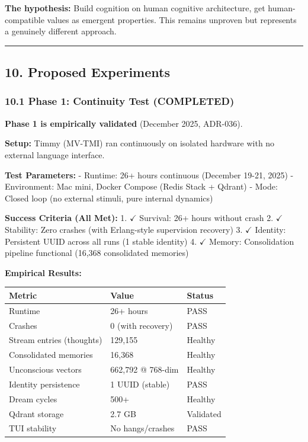 \documentclass[
]{article}
\begin{document}
\textbf{The hypothesis:} Build cognition on human cognitive
architecture, get human-compatible values as emergent properties. This
remains unproven but represents a genuinely different approach.

\begin{center}\rule{0.5\linewidth}{0.5pt}\end{center}

\hypertarget{proposed-experiments}{%
\subsection{10. Proposed Experiments}\label{proposed-experiments}}

\hypertarget{phase-1-continuity-test-completed}{%
\subsubsection{10.1 Phase 1: Continuity Test
(COMPLETED)}\label{phase-1-continuity-test-completed}}

\textbf{Phase 1 is empirically validated} (December 2025, ADR-036).

\textbf{Setup:} Timmy (MV-TMI) ran continuously on isolated hardware
with no external language interface.

\textbf{Test Parameters:} - Runtime: 26+ hours continuous (December
19-21, 2025) - Environment: Mac mini, Docker Compose (Redis Stack +
Qdrant) - Mode: Closed loop (no external stimuli, pure internal
dynamics)

\textbf{Success Criteria (All Met):} 1. $\checkmark$ Survival: 26+ hours without
crash 2. $\checkmark$ Stability: Zero crashes (with Erlang-style supervision
recovery) 3. $\checkmark$ Identity: Persistent UUID across all runs (1 stable
identity) 4. $\checkmark$ Memory: Consolidation pipeline functional (16,368
consolidated memories)

\textbf{Empirical Results:}

\begin{longtable}[]{@{}lll@{}}
\toprule\noalign{}
Metric & Value & Status \\
\midrule\noalign{}
\endhead
\bottomrule\noalign{}
\endlastfoot
Runtime & 26+ hours & PASS \\
Crashes & 0 (with recovery) & PASS \\
Stream entries (thoughts) & 129,155 & Healthy \\
Consolidated memories & 16,368 & Healthy \\
Unconscious vectors & 662,792 @ 768-dim & Healthy \\
Identity persistence & 1 UUID (stable) & PASS \\
Dream cycles & 500+ & Healthy \\
Qdrant storage & 2.7 GB & Validated \\
TUI stability & No hangs/crashes & PASS \\
\end{longtable}
\end{document}
